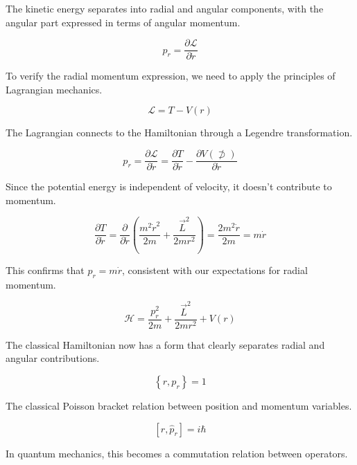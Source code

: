 The kinetic energy separates into radial and angular components, with the angular part expressed in terms of angular momentum.

\begin{equation}
p_{r}=\frac{\partial \mathcal{L}}{\partial \dot{r}}
\end{equation}

To verify the radial momentum expression, we need to apply the principles of Lagrangian mechanics.

\begin{equation}
\mathcal{L}=T-V(r)
\end{equation}

The Lagrangian connects to the Hamiltonian through a Legendre transformation.

\begin{equation}
p_{r}=\frac{\partial \mathcal{L}}{\partial \dot{r}}=\frac{\partial T}{\partial \dot{r}}-\frac{\partial V(\not \supset)}{\partial \dot{r}}
\end{equation}

Since the potential energy is independent of velocity, it doesn't contribute to momentum.

\begin{equation}
\frac{\partial T}{\partial \dot{r}}=\frac{\partial}{\partial \dot{r}}\left(\frac{m^{2} \dot{r}^{2}}{2 m}+\frac{\vec{L}^{2}}{2 m r^{2}}\right)=\frac{2 m^{2} \dot{r}}{2 m}=m \dot{r}
\end{equation}

This confirms that $p_r = m\dot{r}$, consistent with our expectations for radial momentum.

\begin{equation}
\mathcal{H}=\frac{p_{r}^{2}}{2 m}+\frac{\vec{L}^{2}}{2 m r^{2}}+V(r)
\end{equation}

The classical Hamiltonian now has a form that clearly separates radial and angular contributions.

\begin{equation}
\left\{r, p_{r}\right\}=1
\end{equation}

The classical Poisson bracket relation between position and momentum variables.

\begin{equation}
\left[r, \hat{p}_{r}\right]=i \hbar
\end{equation}

In quantum mechanics, this becomes a commutation relation between operators.

